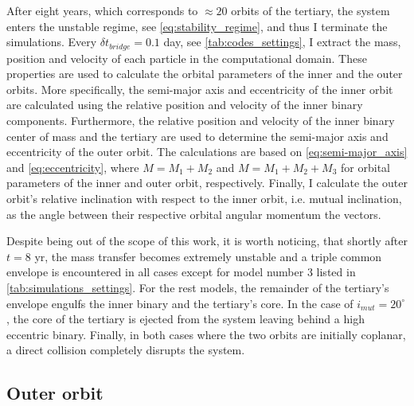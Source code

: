 After eight years, which corresponds to $\approx 20$ orbits of the tertiary, the system enters the unstable regime, see \cref{eq:stability_regime}, and thus I terminate the simulations. Every $\delta t_{bridge}=0.1$ day, see \cref{tab:codes_settings}, I extract the mass, position and velocity of each particle in the computational domain. These properties are used to calculate the orbital parameters of the inner and the outer orbits. More specifically, the semi-major axis and eccentricity of the inner orbit are calculated using the relative position and velocity of the inner binary components. Furthermore, the relative position and velocity of the inner binary center of mass and the tertiary are used to determine the semi-major axis and eccentricity of the outer orbit. The calculations are based on \cref{eq:semi-major_axis} and \cref{eq:eccentricity}, where $M = M_1 + M_2$ and $M = M_1 + M_2 + M_3$ for orbital parameters of the inner and outer orbit, respectively. Finally, I calculate the outer orbit's relative inclination with respect to the inner orbit, i.e. mutual inclination, as the angle between their respective orbital angular momentum the vectors.

Despite being out of the scope of this work, it is worth noticing, that shortly after $t=8$ yr, the mass transfer becomes extremely unstable and a triple common envelope is encountered in all cases except for model number 3 listed in \cref{tab:simulations_settings}. For the rest models, the remainder of the tertiary's envelope engulfs the inner binary and the tertiary's core. In the case of $i_{mut} = 20^{\circ}$, the core of the tertiary is ejected from the system leaving behind a high eccentric binary. Finally, in both cases where the two orbits are initially coplanar, a direct collision completely disrupts the system.

\subsection{Outer orbit}

